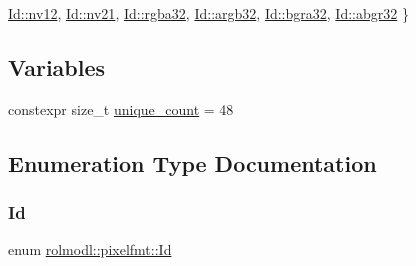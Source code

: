 \begin{DoxyCompactItemize}
\newline
\mbox{\hyperlink{namespacerolmodl_1_1pixelfmt_a96282713e4465ba9211c8fd3a702b52ba70d831c8685ddf61857a6d0e41eb5889}{Id\+::nv12}}, 
\mbox{\hyperlink{namespacerolmodl_1_1pixelfmt_a96282713e4465ba9211c8fd3a702b52bae036dc0b987fb14c9952bb1a12f0173a}{Id\+::nv21}}, 
\mbox{\hyperlink{namespacerolmodl_1_1pixelfmt_a96282713e4465ba9211c8fd3a702b52bab1500b383bccdb3946114a5d708706c4}{Id\+::rgba32}}, 
\mbox{\hyperlink{namespacerolmodl_1_1pixelfmt_a96282713e4465ba9211c8fd3a702b52bae57a429bc01664112d277cc6d93d3ad6}{Id\+::argb32}}, 
\newline
\mbox{\hyperlink{namespacerolmodl_1_1pixelfmt_a96282713e4465ba9211c8fd3a702b52ba8e6e83ea1beca287c17ab578a64af96d}{Id\+::bgra32}}, 
\mbox{\hyperlink{namespacerolmodl_1_1pixelfmt_a96282713e4465ba9211c8fd3a702b52ba6586d03661354a460e38afa3fa9a6516}{Id\+::abgr32}}
 \}
\end{DoxyCompactItemize}
\subsection*{Variables}
\begin{DoxyCompactItemize}
\item 
constexpr size\+\_\+t \mbox{\hyperlink{namespacerolmodl_1_1pixelfmt_af105fb2cc0e76161c52595a6304abe3f}{unique\+\_\+count}} = 48
\end{DoxyCompactItemize}


\subsection{Enumeration Type Documentation}
\mbox{\label{namespacerolmodl_1_1pixelfmt_a96282713e4465ba9211c8fd3a702b52b}} 
\subsubsection{\texorpdfstring{Id}{Id}}
{\footnotesize\ttfamily enum \mbox{\hyperlink{namespacerolmodl_1_1pixelfmt_a96282713e4465ba9211c8fd3a702b52b}{rolmodl\+::pixelfmt\+::\+Id}}\hspace{0.3cm}{\ttfamily [strong]}}

